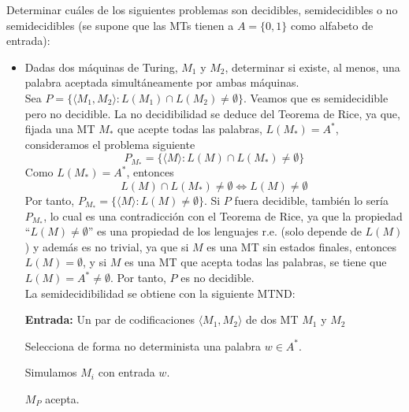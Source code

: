 
\begin{ejercicio}
    Determinar cuáles de los siguientes problemas son decidibles, semidecidibles o no semidecidibles 
    (se supone que las MTs tienen a $A = \{0, 1\}$ como alfabeto de entrada):
    \begin{itemize}
        \item[a)] Dadas dos máquinas de Turing, $M_1$ y $M_2$, determinar si existe, al menos, una palabra
        aceptada simultáneamente por ambas máquinas. \\

        Sea $P = \{\langle M_1, M_2 \rangle : L(M_1) \cap L(M_2) \neq \emptyset\}$. Veamos que es semidecidible pero no 
        decidible. La no decidibilidad se deduce del Teorema de Rice, ya que, fijada una MT $M_{*}$ que acepte 
        todas las palabras, $L(M_*) = A^{*}$, consideramos el problema siguiente 
        $$P_{M_*} = \{\langle M \rangle : L(M) \cap L(M_{*}) \neq \emptyset\}$$ Como $L(M_*) = A^{*}$, entonces
        $$L(M) \cap L(M_{*}) \neq \emptyset \iff L(M) \neq \emptyset$$ Por tanto,
        $P_{M_*} = \{\langle M \rangle : L(M) \neq \emptyset\}$. Si $P$ fuera decidible, también lo sería $P_{M_*}$,
        lo cual es una contradicción con el Teorema de Rice, ya que la propiedad ``$L(M) \neq \emptyset$'' es una propiedad 
        de los lenguajes r.e. (solo depende de $L(M)$) y además es no trivial, ya que si $M$ es una MT sin estados finales, 
        entonces $L(M) = \emptyset$, y si $M$ es una MT que acepta todas las palabras, se tiene que 
        $L(M) = A^{*} \neq \emptyset$. Por tanto, $P$ es no decidible. \\

        La semidecidibilidad se obtiene con la siguiente MTND:

        \begin{algorithm}
            \caption{MTND $M_{P}$}
            \label{algorithm:palabra-simultanea-semidecidible}
            \begin{algorithmic}
                \State \textbf{Entrada:} Un par de codificaciones $\langle M_1, M_2 \rangle$ de dos MT $M_1$ y $M_2$

                \State Selecciona de forma no determinista una palabra $w \in A^{*}$.

                    \State Simulamos $M_i$ con entrada $w$.
                \EndFor

                    \State $M_{P}$ acepta.
                \EndIf
            \end{algorithmic}
        \end{algorithm}


\end{itemize}
\end{ejercicio}
